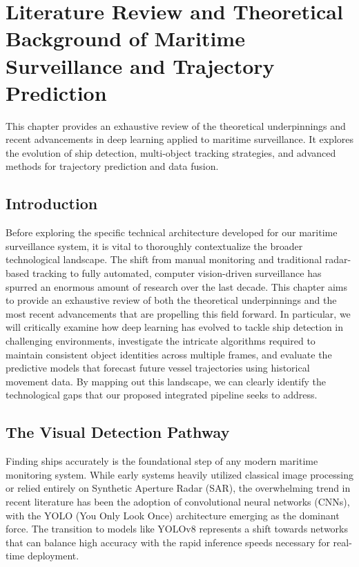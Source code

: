 \chapter{Literature Review and Theoretical Background of Maritime Surveillance and Trajectory Prediction}

This chapter provides an exhaustive review of the theoretical underpinnings and recent advancements in deep learning applied to maritime surveillance. It explores the evolution of ship detection, multi-object tracking strategies, and advanced methods for trajectory prediction and data fusion.

\section{Introduction}
Before exploring the specific technical architecture developed for our maritime surveillance system, it is vital to thoroughly contextualize the broader technological landscape. The shift from manual monitoring and traditional radar-based tracking to fully automated, computer vision-driven surveillance has spurred an enormous amount of research over the last decade. This chapter aims to provide an exhaustive review of both the theoretical underpinnings and the most recent advancements that are propelling this field forward. In particular, we will critically examine how deep learning has evolved to tackle ship detection in challenging environments, investigate the intricate algorithms required to maintain consistent object identities across multiple frames, and evaluate the predictive models that forecast future vessel trajectories using historical movement data. By mapping out this landscape, we can clearly identify the technological gaps that our proposed integrated pipeline seeks to address.

\section{The Visual Detection Pathway}
Finding ships accurately is the foundational step of any modern maritime monitoring system. While early systems heavily utilized classical image processing or relied entirely on Synthetic Aperture Radar (SAR), the overwhelming trend in recent literature has been the adoption of convolutional neural networks (CNNs), with the YOLO (You Only Look Once) architecture emerging as the dominant force. The transition to models like YOLOv8 represents a shift towards networks that can balance high accuracy with the rapid inference speeds necessary for real-time deployment.

